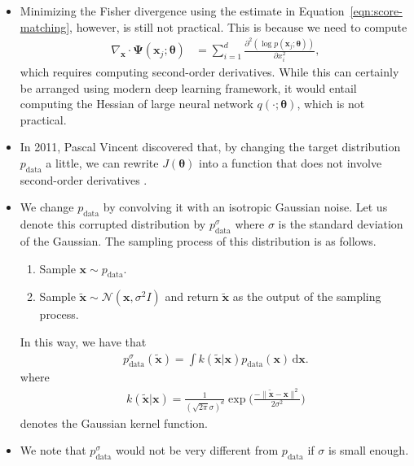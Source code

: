\documentclass[10pt]{article}
\newcommand{\dee}{\mathrm{d}}
\newcommand{\ve}[1]{\mathbf{#1}}
\newcommand{\mrm}[1]{\mathrm{#1}}
\newcommand{\ves}[1]{\boldsymbol{#1}}
\newcommand{\mcal}[1]{\mathcal{#1}}
\begin{document}
\begin{itemize}
  \item Minimizing the Fisher divergence using the estimate in Equation~\eqref{eqn:score-matching}, however, is still not practical. This is because we need to compute
  \begin{align*}
    \nabla_{\ve{x}} \cdot \ves{\Psi}(\ve{x}_j;\ves{\theta})
    &= \sum_{i=1}^d \frac{\partial^2(\log p(\ve{x}_j;\ves{\theta}))}{\partial x_i^2},
  \end{align*}
  which requires computing second-order derivatives. While this can certainly be arranged using modern deep learning framework, it would entail computing the Hessian of large neural network $q(\cdot;\ves{\theta})$, which is not practical.

  \item In 2011, Pascal Vincent discovered that, by changing the target distribution $p_{\mrm{data}}$ a little, we can rewrite $J(\ves{\theta})$ into a function that does not involve second-order derivatives \cite{Vincent:2011}.
  
  \item We change $p_{\mrm{data}}$ by convolving it with an isotropic Gaussian noise. Let us denote this corrupted distribution by $p^\sigma_{\mrm{data}}$ where $\sigma$ is the standard deviation of the Gaussian. The sampling process of this distribution is as follows.
  \begin{enumerate}
    \item Sample $\ve{x} \sim p_{\mrm{data}}$.
    \item Sample $\widetilde{\ve{x}} \sim \mcal{N}(\ve{x}, \sigma^2I)$ and return $\widetilde{\ve{x}}$ as the output of the sampling process.
  \end{enumerate}
  In this way, we have that
  \begin{align*}
    p^\sigma_{\mrm{data}}(\widetilde{{\ve{x}}}) = \int k(\widetilde{\ve{x}}|\ve{x}) p_{\mrm{data}}(\ve{x})\, \dee\ve{x}.
  \end{align*}
  where
  \begin{align*}
    k(\tilde{\ve{x}}|\ve{x}) = \frac{1}{(\sqrt{2\pi}\sigma)^d} \exp\bigg( \frac{-\| \widetilde{\ve{x}} - \ve{x} \|^2}{2\sigma^2} \bigg)
  \end{align*}
  denotes the Gaussian kernel function.

  \item We note that $p^\sigma_{\mrm{data}}$ would not be very different from $p_{\mrm{data}}$ if $\sigma$ is small enough.
  

\end{itemize}
\end{document}
